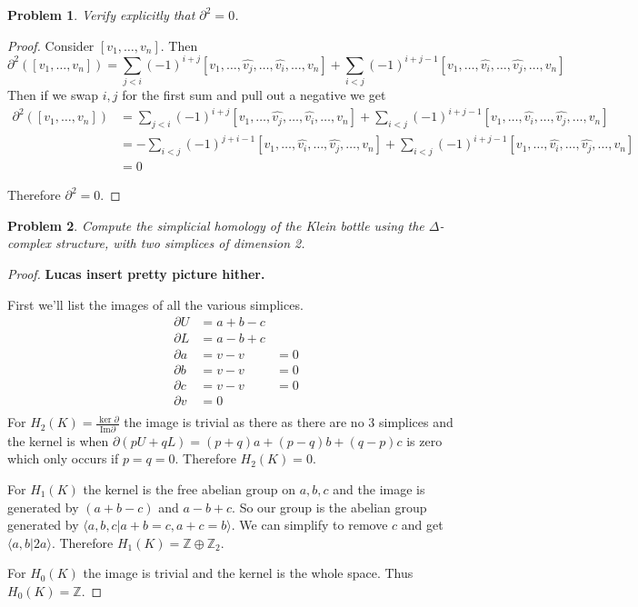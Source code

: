\documentclass[10pt]{article}
\newcommand{\sk}{\vskip 10mm}
\newcommand{\bb}[1]{\mathbb{#1}}
\theoremstyle{plain}
\newtheorem{problem}{Problem}
\theoremstyle{remark}
\begin{document}
\begin{problem}
  Verify explicitly that $\partial^2=0$.
\end{problem}

\begin{proof}
  Consider $[v_1,\ldots,v_n]$. Then
  \[ \partial^2([v_1,\ldots,v_n])=
    \sum_{j<i}(-1)^{i+j}[v_1,\ldots,\hat{v_j},\ldots,\hat{v_i},\ldots, v_n]
    + \sum_{i<j}(-1)^{i+j-1}[v_1,\ldots,\hat{v_i},\ldots,\hat{v_j},\ldots,v_n]\]
  Then if we swap $i,j$ for the first sum and pull out a negative we get
  \begin{align*}
    \partial^2([v_1,\ldots,v_n]) &=\sum_{j<i}(-1)^{i+j}[v_1,\ldots,\hat{v_j},\ldots,\hat{v_i},\ldots, v_n]
                          + \sum_{i<j}(-1)^{i+j-1}[v_1,\ldots,\hat{v_i},\ldots,\hat{v_j},\ldots,v_n]\\
                        & = -\sum_{i<j}(-1)^{j+i-1}[v_1,\ldots,\hat{v_i},\ldots,\hat{v_j},\ldots, v_n]
                          + \sum_{i<j}(-1)^{i+j-1}[v_1,\ldots,\hat{v_i},\ldots,\hat{v_j},\ldots,v_n]\\
                        &= 0
  \end{align*}

  Therefore $\partial^2= 0$.
\end{proof}

\sk

\begin{problem}
  Compute the simplicial homology of the Klein bottle using the
  $\Delta$-complex structure, with two simplices of dimension 2.
\end{problem}

\begin{proof}
  \textbf{Lucas insert pretty picture hither.}

  First we'll list the images of all the various simplices.
  \begin{align*}
    \partial U &= a+b-c\\
    \partial L &= a-b+c\\
    \partial a &= v-v&=0\\
    \partial b &= v-v&=0\\
    \partial c &= v-v&=0\\
    \partial v &= 0\\
  \end{align*}
  For $H_2(K)=\frac{\ker \partial}{\text{Im} \partial}$ the image is trivial as there as
  there are no 3 simplices and the kernel is when $\partial(pU+qL)=(p+q)a+(p-q)b+(q-p)c$
  is zero which only occurs if $p=q=0$. Therefore $H_2(K)=0$.

  For $H_1(K)$ the kernel is the free abelian group on $a,b,c$ and the image
  is generated by $(a+b-c)$ and $a-b+c$. So our group is the abelian group
  generated by $\langle a,b,c|a+b=c,a+c=b\rangle$. We can simplify to remove $c$ and
  get $\langle a,b|2a\rangle$. Therefore $H_1(K)=\bb{Z}\oplus\bb{Z}_2$.

  For $H_0(K)$ the image is trivial and the kernel is the whole space. Thus
  $H_0(K)=\bb{Z}$.
\end{proof}
\end{document}
